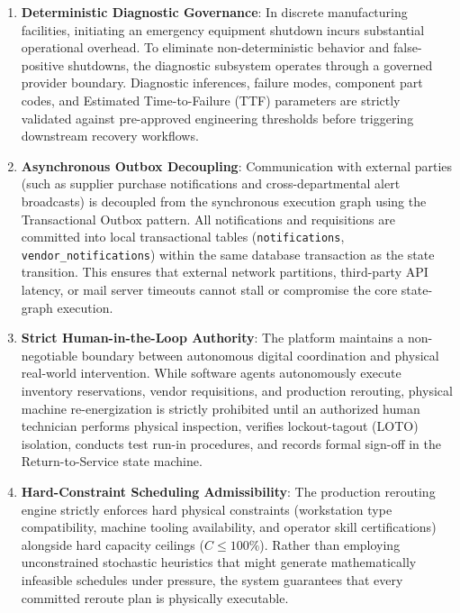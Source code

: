 \documentclass[10pt,twocolumn,a4paper]{article}
\begin{document}
\begin{enumerate}
    \item \textbf{Deterministic Diagnostic Governance}: In discrete manufacturing facilities, initiating an emergency equipment shutdown incurs substantial operational overhead. To eliminate non-deterministic behavior and false-positive shutdowns, the diagnostic subsystem operates through a governed provider boundary. Diagnostic inferences, failure modes, component part codes, and Estimated Time-to-Failure (TTF) parameters are strictly validated against pre-approved engineering thresholds before triggering downstream recovery workflows.
    \item \textbf{Asynchronous Outbox Decoupling}: Communication with external parties (such as supplier purchase notifications and cross-departmental alert broadcasts) is decoupled from the synchronous execution graph using the Transactional Outbox pattern. All notifications and requisitions are committed into local transactional tables (\texttt{notifications}, \texttt{vendor\_notifications}) within the same database transaction as the state transition. This ensures that external network partitions, third-party API latency, or mail server timeouts cannot stall or compromise the core state-graph execution.
    \item \textbf{Strict Human-in-the-Loop Authority}: The platform maintains a non-negotiable boundary between autonomous digital coordination and physical real-world intervention. While software agents autonomously execute inventory reservations, vendor requisitions, and production rerouting, physical machine re-energization is strictly prohibited until an authorized human technician performs physical inspection, verifies lockout-tagout (LOTO) isolation, conducts test run-in procedures, and records formal sign-off in the Return-to-Service state machine.
    \item \textbf{Hard-Constraint Scheduling Admissibility}: The production rerouting engine strictly enforces hard physical constraints (workstation type compatibility, machine tooling availability, and operator skill certifications) alongside hard capacity ceilings ($C \le 100\%$). Rather than employing unconstrained stochastic heuristics that might generate mathematically infeasible schedules under pressure, the system guarantees that every committed reroute plan is physically executable.
\end{enumerate}

\end{document}
